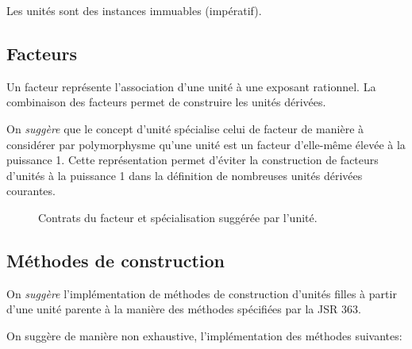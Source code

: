 \documentclass[a4paper,draft,twoside,10pt]{article}
\begin{document}
Les unités sont des instances immuables (impératif).

\subsection{Facteurs}

Un facteur représente l'association d'une unité à une exposant rationnel. La combinaison des facteurs permet de
construire les unités dérivées.

On \emph{suggère} que le concept d'unité spécialise celui de facteur de manière à considérer par polymorphysme qu'une
unité est un facteur d'elle-même élevée à la puissance 1. Cette représentation permet d'éviter la construction de
facteurs d'unités à la puissance 1 dans la définition de nombreuses unités dérivées courantes.


\begin{figure}[!h]
\caption{Contrats du facteur et spécialisation suggérée par l'unité.}
\end{figure}

\subsection{Méthodes de construction}

On \emph{suggère} l'implémentation de méthodes de construction d'unités filles à partir d'une unité parente à la manière
des méthodes spécifiées par la JSR 363.

On suggère de manière non exhaustive, l'implémentation des méthodes suivantes:
\end{document}

